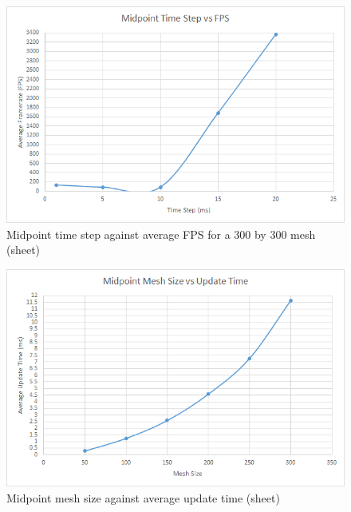     \begin{figure}
    \begin{center}
      \includegraphics[scale=.9]{Figures/sheet_m_ts_fps}
    \end{center}
    \caption{Midpoint time step against average FPS for a 300 by 300 mesh (sheet)}
    \label{fig:m step fps sheet}
  \end{figure}
  
    \begin{figure}
    \begin{center}
      \includegraphics[scale=.9]{Figures/sheet_m_m_ut}
    \end{center}
    \caption{Midpoint mesh size against average update time (sheet)}
    \label{fig:m mesh update sheet}
  \end{figure}
  
